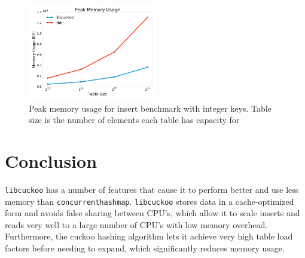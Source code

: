 \documentclass{article}
\newcommand{\tbbmap}{\texttt{concurrent\textunderscore hash\textunderscore map}}
\newcommand{\libcuckoo}{\texttt{libcuckoo}}
\begin{document}
\begin{figure}[!htbp]
  \centering
  \includegraphics[width=0.5\textwidth]{mem}
  \caption{Peak memory usage for insert benchmark with integer keys. Table size
    is the number of elements each table has capacity for}
  \label{fig:mem}
\end{figure}

\section*{Conclusion}

{\libcuckoo} has a number of features that cause it to perform better and use
less memory than {\tbbmap}. {\libcuckoo} stores data in a cache-optimized form
and avoids false sharing between CPU's, which allow it to scale inserts and
reads very well to a large number of CPU's with low memory overhead.
Furthermore, the cuckoo hashing algorithm lets it achieve very high table load
factors before needing to expand, which significantly reduces memory usage.
\end{document}
